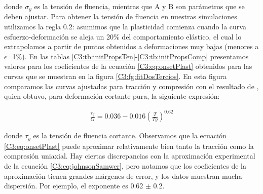 donde $\sigma{}_{y}$ es la tensión de fluencia, mientras que A y B son parámetros que se deben ajustar. Para obtener la tensión de fluencia en nuestras simulaciones utilizamos la regla 0.2: asumimos que la plasticidad comienza cuando la curva esfuerzo-deformación se aleja un 20\% del comportamiento elástico, el cual lo extrapolamos a partir de puntos obtenidos a deformaciones muy bajas (menores a $\epsilon$=1\%). En las tablas \ref{C3:tb:initPropsTen}-\ref{C3:tb:initPropsComp} presentamos valores para los coeficientes de la ecuación \ref{C3:eq:onsetPlast} obtenidos para las curvas que se muestran en la figura \ref{C3:fg:fitDosTercios}. En esta figura comparamos las curvas ajustadas para tracción y compresión con el resultado de \cite{johnson05}, quien obtuvo, para  deformación cortante pura, la siguiente expresión:


\begin{eqnarray}
\frac{\tau _{y}}{G} = 0.036-0.016\left( \frac{T}{Tg} \right)^{0.62}
\label{C3:eq:johnsonSamwer}
\end{eqnarray}

donde $\tau _{y}$ es la tensión de fluencia cortante. Observamos que la ecuación \ref{C3:eq:onsetPlast} puede aproximar relativamente bien tanto la tracción como la compresión uniaxial. Hay ciertas discrepancias con la aproximación experimental de la ecuación \ref{C3:eq:johnsonSamwer}, pero notamos que los coeficientes de la aproximación tienen grandes márgenes de error, y los datos muestran mucha dispersión. Por ejemplo, el exponente es  0.62 $\pm$ 0.2.
	


